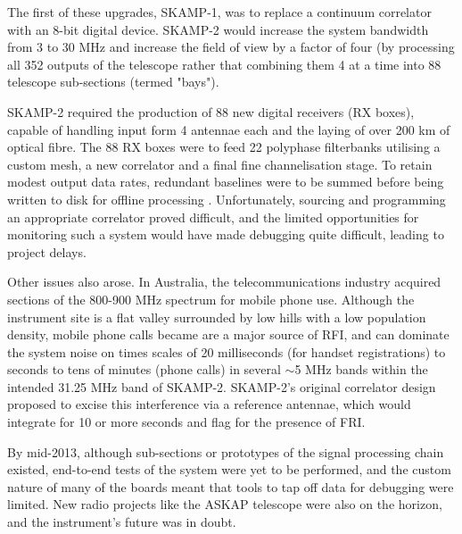 The first of these upgrades, SKAMP-1, was to replace a continuum correlator with an 8-bit digital device. SKAMP-2 would increase the system bandwidth from 3 to 30 MHz and increase the field of view by a factor of four (by processing all 352 outputs of the telescope rather that combining them 4 at a time into 88 telescope sub-sections (termed "bays").

SKAMP-2 required the production of 88 new digital receivers (RX boxes), capable of handling input form 4 antennae each and the laying of over 200 km of optical fibre. The 88 RX boxes were to feed 22 polyphase filterbanks utilising a custom mesh, a new correlator and a final fine channelisation stage. To retain modest output data rates, redundant baselines were to be summed before being written to disk for offline processing \citep{Adams_2004}. Unfortunately, sourcing and programming an appropriate correlator proved difficult, and the limited opportunities for monitoring such a system would have made debugging quite difficult, leading to project delays.

Other issues also arose. In Australia, the telecommunications industry acquired sections of the 800-900 MHz spectrum for mobile phone use. Although the instrument site is a flat valley surrounded by low hills with a low population density, mobile phone calls became are a major source of RFI, and can dominate the system noise on times scales of 20 milliseconds (for handset registrations) to seconds to tens of minutes (phone calls) in several $\sim$5 MHz bands within the intended 31.25 MHz band of SKAMP-2. SKAMP-2's original correlator design proposed to excise this interference via a reference antennae, which would integrate for 10 or more seconds and flag for the presence of FRI. 

By mid-2013, although sub-sections or prototypes of the signal processing chain existed, end-to-end tests of the system were yet to be performed, and the custom nature of many of the boards meant that tools to tap off data for debugging were limited. New radio projects like the ASKAP telescope were also on the horizon, and the instrument's future was in doubt.

    
    